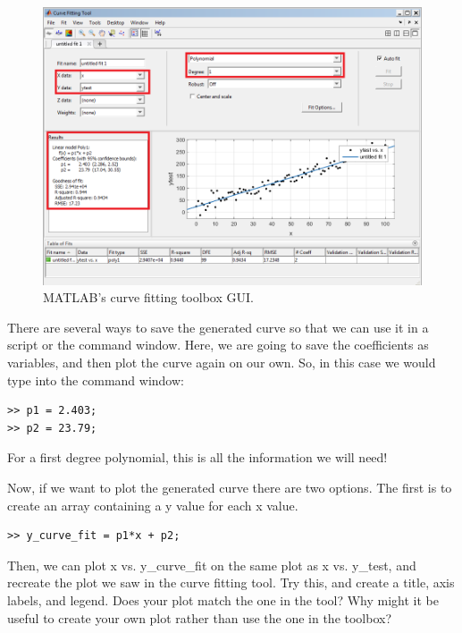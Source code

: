 \documentclass[paper=a4, fontsize=11pt]{scrartcl} %
\numberwithin{equation}{section} %
\numberwithin{figure}{section} %
\numberwithin{table}{section} %
\begin{document}
\begin{figure}[h!]
\centering
\includegraphics[scale=.65]{cftool_screenshot}
\caption{MATLAB's curve fitting toolbox GUI.}
\end{figure}

There are several ways to save the generated curve so that we can use it in a script or the command window. 
Here, we are going to save the coefficients as variables, and then plot the curve again on our own.
So, in this case we would type into the command window: 
\begin{verbatim}
>> p1 = 2.403;
>> p2 = 23.79;
\end{verbatim}
For a first degree polynomial, this is all the information we will need!

Now, if we want to plot the generated curve there are two options. 
The first is to create an array containing a y value for each x value. 
\begin{verbatim}
>> y_curve_fit = p1*x + p2;
\end{verbatim}
Then, we can plot x vs. y\_curve\_fit on the same plot as x vs. y\_test, and recreate the plot we saw in the curve fitting tool. 
Try this, and create a title, axis labels, and legend. 
Does your plot match the one in the tool? Why might it be useful to create your own plot rather than use the one in the toolbox?
\end{document}

